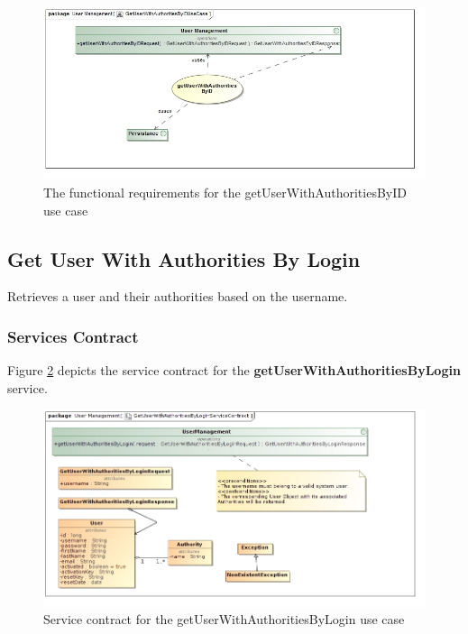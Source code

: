 \begin{figure}[H]
	\begin{center}
		\includegraphics[scale=0.5]{../Diagrams and Charts/Users/Get User With Authorities By ID Use Case.jpg}
		\caption{The functional requirements for the getUserWithAuthoritiesByID use case}
		\label{fig:getUserWithAuthoritiesByIDUseCase}
	\end{center}	
\end{figure}

\subsection{Get User With Authorities By Login}
Retrieves a user and their authorities based on the username.

\subsubsection{Services Contract}
Figure \ref{fig:GetUserWithAuthoritiesByLoginServicesContract} depicts the service
contract for the \textbf{getUserWithAuthoritiesByLogin} service.

\begin{figure}[H]
	\begin{center}
		\includegraphics[scale=0.55]{../Diagrams and Charts/Users/GetUserWithAuthoritiesByLoginServiceContract.jpg}
		\caption{Service contract for the getUserWithAuthoritiesByLogin use case}
		\label{fig:GetUserWithAuthoritiesByLoginServicesContract}
	\end{center}
\end{figure}

